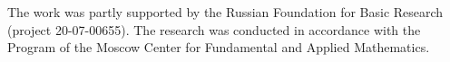 

\vspace*{-20pt}

\Ack

\vspace*{-6pt}

\noindent
The work was partly supported by the Russian Foundation for Basic Research 
(project 20-07-00655). The research was conducted in accordance with the 
Program of the Moscow Center for Fundamental and Applied Mathematics.


